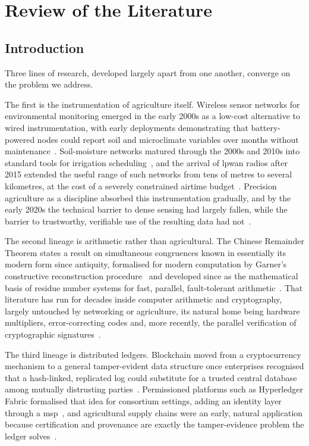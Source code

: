 \documentclass[12pt,a4paper,oneside]{book}
\begin{document}
\chapter{Review of the Literature}
\label{ch:literature}

\section{Introduction}
\label{sec:lit_history}

Three lines of research, developed largely apart from one another, converge on
the problem we address.

The first is the instrumentation of agriculture itself. Wireless sensor
networks for environmental monitoring emerged in the early 2000s as a
low-cost alternative to wired instrumentation, with early deployments
demonstrating that battery-powered nodes could report soil and microclimate
variables over months without maintenance~\cite{wang2006wireless, pierce1999site}. Soil-moisture networks matured through the 2000s and 2010s
into standard tools for irrigation scheduling~\cite{bogena2010soil, evans2008precision}, and the arrival of \gls{lpwan} radios after 2015
extended the useful range of such networks from tens of metres to several
kilometres, at the cost of a severely constrained airtime
budget~\cite{adelantado2017understanding, raj2017comprehensive}. Precision
agriculture as a discipline absorbed this instrumentation gradually, and by
the early 2020s the technical barrier to dense sensing had largely fallen,
while the barrier to trustworthy, verifiable use of the resulting data had
not~\cite{mcbratney2005future, aydin2021comprehensive}.

The second lineage is arithmetic rather than agricultural. The Chinese
Remainder Theorem states a result on simultaneous congruences known in
essentially its modern form since antiquity, formalised for modern
computation by Garner's constructive reconstruction
procedure~\cite{garner1959residue} and developed since as the mathematical
basis of residue number systems for fast, parallel, fault-tolerant
arithmetic~\cite{ding1996remainder, parhami2010computer}. That literature
has run for decades inside computer arithmetic and cryptography, largely
untouched by networking or agriculture, its natural home being hardware
multipliers, error-correcting codes and, more recently, the parallel
verification of cryptographic
signatures~\cite{knuth1997art, hardy2008introduction, shoup2009computational}.

The third lineage is distributed ledgers. Blockchain moved from a
cryptocurrency mechanism to a general tamper-evident data structure once
enterprises recognised that a hash-linked, replicated log could substitute
for a trusted central database among mutually
distrusting parties~\cite{christidis2016blockchain, gubbi2013internet}.
Permissioned platforms such as Hyperledger Fabric formalised that idea for
consortium settings, adding an identity layer through a
\gls{msp}~\cite{jayaram2023hyperledger, hyperledger2022msp}, and agricultural
supply chains were an early, natural application because certification and
provenance are exactly the tamper-evidence problem the ledger
solves~\cite{tian2016agri, xu2016blockchain, salah2019blockchain}.
\end{document}
